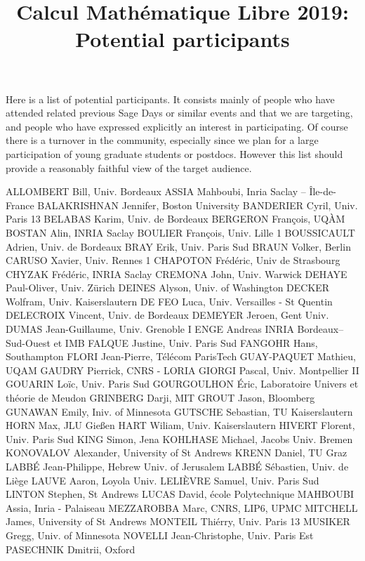 \documentclass[12pt]{amsart}
\title{Calcul Mathématique Libre 2019:\\Potential participants}
\date{}
\begin{document}
\maketitle
\thispagestyle{empty}

Here is a list of potential participants. It consists mainly of people
who have attended related previous Sage Days or similar events and
that we are targeting, and people who have expressed explicitly an
interest in participating. Of course there is a turnover in the
community, especially since we plan for a large participation of young
graduate students or postdocs. However this list should provide a
reasonably faithful view of the target audience.

\bigskip

\obeylines
ALLOMBERT Bill, Univ. Bordeaux
ASSIA Mahboubi, Inria Saclay -- Île-de-France
BALAKRISHNAN Jennifer, Boston University 
BANDERIER Cyril, Univ. Paris 13
BELABAS Karim, Univ. de Bordeaux
BERGERON François, UQÀM
BOSTAN Alin, INRIA Saclay
BOULIER François, Univ. Lille 1
BOUSSICAULT Adrien, Univ. de Bordeaux
BRAY Erik, Univ. Paris Sud
BRAUN Volker, Berlin
CARUSO Xavier, Univ. Rennes 1
CHAPOTON Frédéric, Univ de Strasbourg
CHYZAK Frédéric, INRIA Saclay
CREMONA John, Univ. Warwick
DEHAYE Paul-Oliver, Univ. Zürich
DEINES Alyson, Univ. of Washington
DECKER Wolfram, Univ. Kaiserslautern
DE FEO Luca, Univ. Versailles - St Quentin
DELECROIX Vincent, Univ. de Bordeaux
DEMEYER Jeroen, Gent Univ.
DUMAS Jean-Guillaume, Univ. Grenoble I
ENGE Andreas INRIA Bordeaux–Sud-Ouest et IMB
FALQUE Justine, Univ. Paris Sud
FANGOHR Hans, Southampton
FLORI Jean-Pierre, Télécom ParisTech
GUAY-PAQUET Mathieu, UQAM
GAUDRY Pierrick, CNRS - LORIA
GIORGI Pascal, Univ. Montpellier II
GOUARIN Loïc, Univ. Paris Sud
GOURGOULHON Éric, Laboratoire Univers et théorie de Meudon
GRINBERG Darji, MIT
GROUT Jason, Bloomberg
GUNAWAN Emily, Iniv. of Minnesota
GUTSCHE Sebastian, TU Kaiserslautern
HORN Max, JLU Gießen
HART Wiliam, Univ. Kaiserslautern
HIVERT Florent, Univ. Paris Sud
KING Simon, Jena
KOHLHASE Michael, Jacobs Univ. Bremen
KONOVALOV Alexander, University of St Andrews
KRENN Daniel, TU Graz
LABBÉ Jean-Philippe, Hebrew Univ. of Jerusalem
LABBÉ Sébastien, Univ. de Liège
LAUVE Aaron, Loyola Univ.
LELIÈVRE Samuel, Univ. Paris Sud
LINTON Stephen, St Andrews
LUCAS David, école Polytechnique
MAHBOUBI Assia, Inria - Palaiseau
MEZZAROBBA Marc, CNRS, LIP6, UPMC
MITCHELL James, University of St Andrews
MONTEIL Thiérry, Univ. Paris 13
MUSIKER Gregg, Univ. of Minnesota
NOVELLI Jean-Christophe, Univ. Paris Est
PASECHNIK Dmitrii, Oxford
\end{document}
